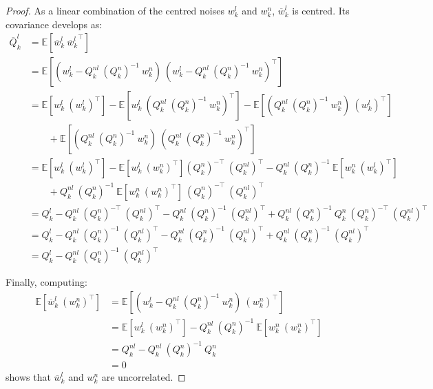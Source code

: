 \begin{proof}
	As a linear combination of the centred noises $w_k^l$ and $w_k^n$, $\overline{w}_k^l$ is centred. Its covariance develops as:
	\begin{equation}
		\begin{aligned}
		\overline{Q}_k^l&=\mathbb{E}\left[\overline{w}_k^l\:{\overline{w}_k^l}^\top\right]\\
		&=\mathbb{E}\left[(w_k^l-Q_k^{nl}\:(Q_k^n)^{-1}\:w_k^n)\:(w_k^l-Q_k^{nl}\:(Q_k^n)^{-1}\:w_k^n)^\top\right]\\
		&=\mathbb{E}\left[w_k^l\:(w_k^l)^\top\right]-\mathbb{E}\left[w_k^l\:(Q_k^{nl}\:(Q_k^n)^{-1}\:w_k^n)^\top\right]-\mathbb{E}\left[(Q_k^{nl}\:(Q_k^n)^{-1}\:w_k^n)\:(w_k^l)^\top\right]\\
		&\qquad+\mathbb{E}\left[(Q_k^{nl}\:(Q_k^n)^{-1}\:w_k^n)\:(Q_k^{nl}\:(Q_k^n)^{-1}\:w_k^n)^\top\right]\\
		&=\mathbb{E}\left[w_k^l\:(w_k^l)^\top\right]-\mathbb{E}\left[w_k^l\:(w_k^n)^\top\right](Q_k^n)^{-\top}\:(Q_k^{nl})^\top-Q_k^{nl}\:(Q_k^n)^{-1}\:\mathbb{E}\left[w_k^n\:(w_k^l)^\top\right]\\
		&\qquad+Q_k^{nl}\:(Q_k^n)^{-1}\:\mathbb{E}\left[w_k^n\:(w_k^n)^\top\right]\:(Q_k^n)^{-\top}\:(Q_k^{nl})^\top\\
		&=Q_k^l-Q_k^{nl}\:(Q_k^n)^{-\top}\:(Q_k^{nl})^\top-Q_k^{nl}\:(Q_k^n)^{-1}\:(Q_k^{nl})^\top+Q_k^{nl}\:(Q_k^n)^{-1}\:Q_k^n\:(Q_k^n)^{-\top}\:(Q_k^{nl})^\top\\
		&=Q_k^l-Q_k^{nl}\:(Q_k^n)^{-1}\:(Q_k^{nl})^\top-Q_k^{nl}\:(Q_k^n)^{-1}\:(Q_k^{nl})^\top+Q_k^{nl}\:(Q_k^n)^{-1}\:(Q_k^{nl})^\top\\
		&=Q_k^l-Q_k^{nl}\:(Q_k^n)^{-1}\:(Q_k^{nl})^\top
		\end{aligned}
	\end{equation}

	Finally, computing:
	\begin{equation}
		\begin{aligned}
		\mathbb{E}\left[\overline{w}_k^l\:(w_k^n)^\top\right]&=\mathbb{E}\left[(w_k^l-Q_k^{nl}\:(Q_k^n)^{-1}\:w_k^n)\:(w_k^n)^\top\right]\\
		&=\mathbb{E}\left[w_k^l\:(w_k^n)^\top\right]-Q_k^{nl}\:(Q_k^n)^{-1}\:\mathbb{E}\left[w_k^n\:(w_k^n)^\top\right]\\
		&=Q_k^{nl}-Q_k^{nl}\:(Q_k^n)^{-1}\:Q_k^n\\
		&=0
		\end{aligned}
	\end{equation}
	shows that $\overline{w}_k^l$ and $w_k^n$ are uncorrelated.
\end{proof}

